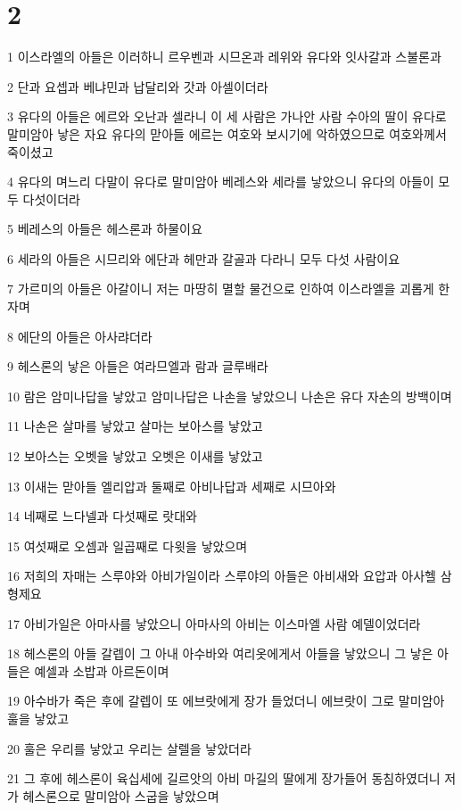 \chapter{2}

\par 1 이스라엘의 아들은 이러하니 르우벤과 시므온과 레위와 유다와 잇사갈과 스불론과
\par 2 단과 요셉과 베냐민과 납달리와 갓과 아셀이더라
\par 3 유다의 아들은 에르와 오난과 셀라니 이 세 사람은 가나안 사람 수아의 딸이 유다로 말미암아 낳은 자요 유다의 맏아들 에르는 여호와 보시기에 악하였으므로 여호와께서 죽이셨고
\par 4 유다의 며느리 다말이 유다로 말미암아 베레스와 세라를 낳았으니 유다의 아들이 모두 다섯이더라
\par 5 베레스의 아들은 헤스론과 하물이요
\par 6 세라의 아들은 시므리와 에단과 헤만과 갈골과 다라니 모두 다섯 사람이요
\par 7 가르미의 아들은 아갈이니 저는 마땅히 멸할 물건으로 인하여 이스라엘을 괴롭게 한 자며
\par 8 에단의 아들은 아사랴더라
\par 9 헤스론의 낳은 아들은 여라므엘과 람과 글루배라
\par 10 람은 암미나답을 낳았고 암미나답은 나손을 낳았으니 나손은 유다 자손의 방백이며
\par 11 나손은 살마를 낳았고 살마는 보아스를 낳았고
\par 12 보아스는 오벳을 낳았고 오벳은 이새를 낳았고
\par 13 이새는 맏아들 엘리압과 둘째로 아비나답과 세째로 시므아와
\par 14 네째로 느다넬과 다섯째로 랏대와
\par 15 여섯째로 오셈과 일곱째로 다윗을 낳았으며
\par 16 저희의 자매는 스루야와 아비가일이라 스루야의 아들은 아비새와 요압과 아사헬 삼형제요
\par 17 아비가일은 아마사를 낳았으니 아마사의 아비는 이스마엘 사람 예델이었더라
\par 18 헤스론의 아들 갈렙이 그 아내 아수바와 여리옷에게서 아들을 낳았으니 그 낳은 아들은 예셀과 소밥과 아르돈이며
\par 19 아수바가 죽은 후에 갈렙이 또 에브랏에게 장가 들었더니 에브랏이 그로 말미암아 훌을 낳았고
\par 20 훌은 우리를 낳았고 우리는 살렐을 낳았더라
\par 21 그 후에 헤스론이 육십세에 길르앗의 아비 마길의 딸에게 장가들어 동침하였더니 저가 헤스론으로 말미암아 스굽을 낳았으며
